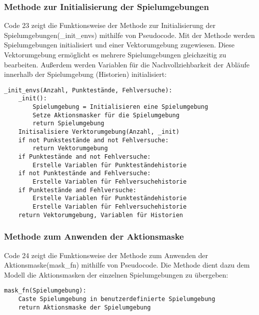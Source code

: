 \subsubsection{Methode zur Initialisierung der Spielumgebungen}
\begin{minipage}{\linewidth}
Code 23 zeigt die Funktionsweise der Methode zur Initialisierung der Spielumgebungen(\_init\_envs) mithilfe von Pseudocode. Mit der Methode werden Spielumgebungen initialisiert und einer Vektorumgebung zugewiesen. Diese Vektorumgebung ermöglicht es mehrere Spielumgebungen gleichzeitig zu bearbeiten. Außerdem werden Variablen für die Nachvollziehbarkeit der Abläufe innerhalb der Spielumgebung (Historien) initialisiert:
\vspace{0.5cm}
\begin{lstlisting}[caption={Methode zur Initialisierung der Spielumgebungen}]
_init_envs(Anzahl, Punktestände, Fehlversuche):
	_init():
		Spielumgebung = Initialisieren eine Spielumgebung
		Setze Aktionsmasker für die Spielumgebung
		return Spielumgebung
	Initisalisiere Verktorumgebung(Anzahl, _init)
	if not Punkstestände and not Fehlversuche:
		return Vektorumgebung
	if Punktestände and not Fehlversuche:
		Erstelle Variablen für Punkteständehistorie
	if not Punktestände and Fehlversuche:
		Erstelle Variablen für Fehlversuchehistorie
	if Punktestände and Fehlversuche:
		Erstelle Variablen für Punkteständehistorie
		Erstelle Variablen für Fehlversuchehistorie
	return Vektorumgebung, Variablen für Historien
\end{lstlisting}
\end{minipage}

\subsubsection{Methode zum Anwenden der Aktionsmaske}
\begin{minipage}{\linewidth}
Code 24 zeigt die Funktionsweise der Methode zum Anwenden der Aktionsmaske(mask\_fn) mithilfe von Pseudocode. Die Methode dient dazu dem Modell die Aktionsmasken der einzelnen Spielumgebungen zu übergeben:
\vspace{0.5cm}
\begin{lstlisting}[caption={Methode zum Anwenden der Aktionsmaske}]
mask_fn(Spielumgebung):
	Caste Spielumgebung in benutzerdefinierte Spielumgebung
	return Aktionsmaske der Spielumgebung
\end{lstlisting}
\end{minipage}

